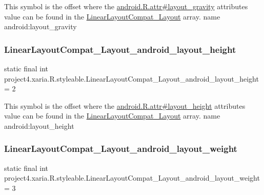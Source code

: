 This symbol is the offset where the \hyperlink{}{android.\+R.\+attr\#layout\+\_\+gravity} attribute\textquotesingle{}s value can be found in the \hyperlink{classproject4_1_1xaria_1_1R_1_1styleable_abae4849d55752ff5e7c774316d11a406}{Linear\+Layout\+Compat\+\_\+\+Layout} array.  name android\+:layout\+\_\+gravity \mbox{\label{classproject4_1_1xaria_1_1R_1_1styleable_a514bc318a57eacc2db4dabf146f619d7}} 
\subsubsection{\texorpdfstring{Linear\+Layout\+Compat\+\_\+\+Layout\+\_\+android\+\_\+layout\+\_\+height}{LinearLayoutCompat\_Layout\_android\_layout\_height}}
{\footnotesize\ttfamily static final int project4.\+xaria.\+R.\+styleable.\+Linear\+Layout\+Compat\+\_\+\+Layout\+\_\+android\+\_\+layout\+\_\+height = 2\hspace{0.3cm}{\ttfamily [static]}}

This symbol is the offset where the \hyperlink{}{android.\+R.\+attr\#layout\+\_\+height} attribute\textquotesingle{}s value can be found in the \hyperlink{classproject4_1_1xaria_1_1R_1_1styleable_abae4849d55752ff5e7c774316d11a406}{Linear\+Layout\+Compat\+\_\+\+Layout} array.  name android\+:layout\+\_\+height \mbox{\label{classproject4_1_1xaria_1_1R_1_1styleable_af9b6891271285deca2960de74d2f02e6}} 
\subsubsection{\texorpdfstring{Linear\+Layout\+Compat\+\_\+\+Layout\+\_\+android\+\_\+layout\+\_\+weight}{LinearLayoutCompat\_Layout\_android\_layout\_weight}}
{\footnotesize\ttfamily static final int project4.\+xaria.\+R.\+styleable.\+Linear\+Layout\+Compat\+\_\+\+Layout\+\_\+android\+\_\+layout\+\_\+weight = 3\hspace{0.3cm}{\ttfamily [static]}}


